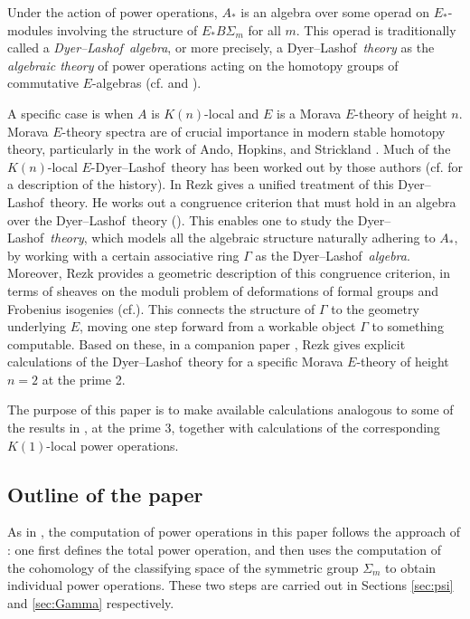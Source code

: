\documentclass{gtpart}
\theoremstyle{definition}
\theoremstyle{remark}
\newcommand{\cff}[2]{cf.\thinspace{\cite[#1]{#2}}}
\newcommand{\DL}{Dyer--Lashof~}
\newcommand{\G}{\Gamma}
\begin{document}
Under the action of power operations, $A_*$ is an algebra over some operad on $E_*$-modules involving the structure of $E_* B\Sigma_m$ for all $m$.  
This operad is traditionally called a {\em \DL algebra}, or more precisely, 
a \DL {\em theory} as the {\em algebraic theory} of power operations acting on the homotopy groups of commutative $E$-algebras 
(\cff{Chapters III, VIII, and IX}{H_infty} and \cite[Section 9]{lpo}).  

A specific case is when $A$ is $K(n)$-local and $E$ is a Morava $E$-theory of height $n$.  
Morava $E$-theory spectra are of crucial importance in modern stable homotopy theory, 
particularly in the work of Ando, Hopkins, and Strickland \cite{cube}.  
Much of the $K(n)$-local $E$-\DL theory has been worked out by those authors (\cff{1.5}{cong} for a description of the history).  
In \cite{cong} Rezk gives a unified treatment of this \DL theory.  
He works out a congruence criterion that must hold in an algebra over the \DL theory (\cite[Theorem A]{cong}).  
This enables one to study the \DL {\em theory}, which models all the algebraic structure naturally adhering to $A_*$, 
by working with a certain associative ring $\G$ as the \DL {\em algebra}.  
Moreover, Rezk provides a geometric description of this congruence criterion, 
in terms of sheaves on the moduli problem of deformations of formal groups and Frobenius isogenies (\cff{Theorem B}{cong}).  
This connects the structure of $\G$ to the geometry underlying $E$, 
moving one step forward from a workable object $\G$ to something computable.  
Based on these, in a companion paper \cite{h2p2}, 
Rezk gives explicit calculations of the \DL theory for a specific Morava $E$-theory of height $n = 2$ at the prime 2.  

The purpose of this paper is to make available calculations analogous to some of the results in \cite{h2p2}, at the prime 3, 
together with calculations of the corresponding $K(1)$-local power operations.  


\subsection*{Outline of the paper}

As in \cite{h2p2}, the computation of power operations in this paper follows the approach of \cite{steenrod}: 
one first defines the total power operation, 
and then uses the computation of the cohomology of the classifying space of the symmetric group $\Sigma_m$ to obtain individual power operations.  
These two steps are carried out in Sections \ref{sec:psi} and \ref{sec:Gamma} respectively.  
\end{document}
